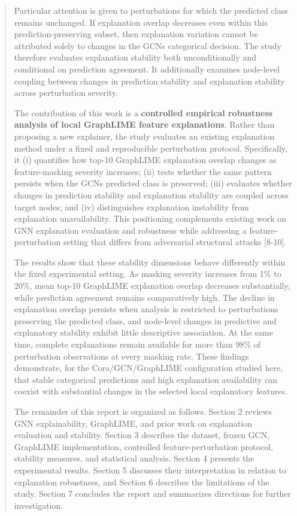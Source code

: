 \documentclass[a4paper]{article}
\begin{document}
\begin{quote}
Particular attention is given to perturbations for which the predicted
class remains unchanged. If explanation overlap decreases even within
this prediction-preserving subset, then explanation variation cannot be
attributed solely to changes in the GCN\textquotesingle s categorical
decision. The study therefore evaluates explanation stability both
unconditionally and conditional on prediction agreement. It additionally
examines node-level coupling between changes in prediction stability and
explanation stability across perturbation severity.

The contribution of this work is a \textbf{controlled empirical
robustness analysis of local GraphLIME feature explanations}. Rather
than proposing a new explainer, the study evaluates an existing
explanation method under a fixed and reproducible perturbation protocol.
Specifically, it (i) quantifies how top-10 GraphLIME explanation overlap
changes as feature-masking severity increases; (ii) tests whether the
same pattern persists when the GCN\textquotesingle s predicted class is
preserved; (iii) evaluates whether changes in prediction stability and
explanation stability are coupled across target nodes; and (iv)
distinguishes explanation instability from explanation unavailability.
This positioning complements existing work on GNN explanation evaluation
and robustness while addressing a feature-perturbation setting that
differs from adversarial structural attacks {[}8-10{]}.

The results show that these stability dimensions behave differently
within the fixed experimental setting. As masking severity increases
from 1\% to 20\%, mean top-10 GraphLIME explanation overlap decreases
substantially, while prediction agreement remains comparatively high.
The decline in explanation overlap persists when analysis is restricted
to perturbations preserving the predicted class, and node-level changes
in predictive and explanatory stability exhibit little descriptive
association. At the same time, complete explanations remain available
for more than 98\% of perturbation observations at every masking rate.
These findings demonstrate, for the Cora/GCN/GraphLIME configuration
studied here, that stable categorical predictions and high explanation
availability can coexist with substantial changes in the selected local
explanatory features.

The remainder of this report is organized as follows. Section 2 reviews
GNN explainability, GraphLIME, and prior work on explanation evaluation
and stability. Section 3 describes the dataset, frozen GCN, GraphLIME
implementation, controlled feature-perturbation protocol, stability
measures, and statistical analysis. Section 4 presents the experimental
results. Section 5 discusses their interpretation in relation to
explanation robustness, and Section 6 describes the limitations of the
study. Section 7 concludes the report and summarizes directions for
further investigation.
\end{quote}
\end{document}

